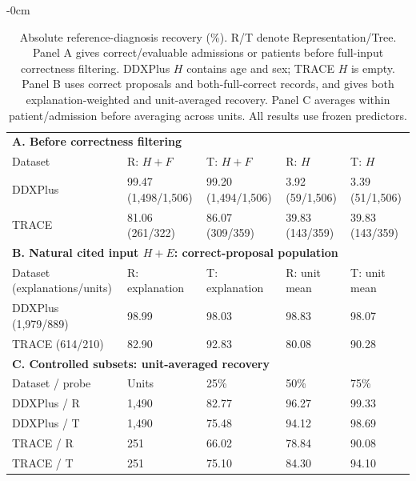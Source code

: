 \begin{table}[!htbp]
\begin{adjustwidth}{-\extralength}{0cm}
\centering\footnotesize
\caption{Absolute reference-diagnosis recovery (\%). R/T denote Representation/Tree. Panel A gives correct/evaluable admissions or patients before full-input correctness filtering. DDXPlus $H$ contains age and sex; TRACE $H$ is empty. Panel B uses correct proposals and both-full-correct records, and gives both explanation-weighted and unit-averaged recovery. Panel C averages within patient/admission before averaging across units. All results use frozen predictors.}\label{tab:absolute-recovery}
\begin{tabular}{lllll}\toprule
\multicolumn{5}{l}{\textbf{A. Before correctness filtering}}\\
Dataset & R: $H+F$ & T: $H+F$ & R: $H$ & T: $H$\\\midrule
DDXPlus & 99.47 (1,498/1,506) & 99.20 (1,494/1,506) & 3.92 (59/1,506) & 3.39 (51/1,506) \\
TRACE & 81.06 (261/322) & 86.07 (309/359) & 39.83 (143/359) & 39.83 (143/359) \\
\midrule
\multicolumn{5}{l}{\textbf{B. Natural cited input $H+E$: correct-proposal population}}\\
Dataset (explanations/units) & R: explanation & T: explanation & R: unit mean & T: unit mean\\\midrule
DDXPlus (1,979/889) & 98.99 & 98.03 & 98.83 & 98.07 \\
TRACE (614/210) & 82.90 & 92.83 & 80.08 & 90.28 \\
\midrule
\multicolumn{5}{l}{\textbf{C. Controlled subsets: unit-averaged recovery}}\\
Dataset / probe & Units & 25\% & 50\% & 75\%\\\midrule
DDXPlus / R & 1,490 & 82.77 & 96.27 & 99.33 \\
DDXPlus / T & 1,490 & 75.48 & 94.12 & 98.69 \\
TRACE / R & 251 & 66.02 & 78.84 & 90.08 \\
TRACE / T & 251 & 75.10 & 84.30 & 94.10 \\
\bottomrule\end{tabular}
\end{adjustwidth}
\end{table}
